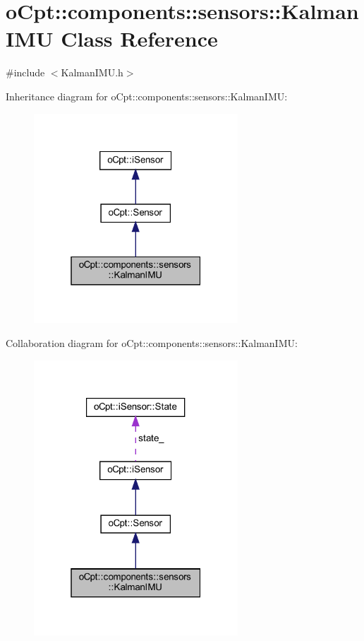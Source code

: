\hypertarget{classo_cpt_1_1components_1_1sensors_1_1_kalman_i_m_u}{}\section{o\+Cpt\+:\+:components\+:\+:sensors\+:\+:Kalman\+I\+MU Class Reference}
\label{classo_cpt_1_1components_1_1sensors_1_1_kalman_i_m_u}


{\ttfamily \#include $<$Kalman\+I\+M\+U.\+h$>$}



Inheritance diagram for o\+Cpt\+:\+:components\+:\+:sensors\+:\+:Kalman\+I\+MU\+:
\nopagebreak
\begin{figure}[H]
\begin{center}
\leavevmode
\includegraphics[width=217pt]{classo_cpt_1_1components_1_1sensors_1_1_kalman_i_m_u__inherit__graph}
\end{center}
\end{figure}


Collaboration diagram for o\+Cpt\+:\+:components\+:\+:sensors\+:\+:Kalman\+I\+MU\+:
\nopagebreak
\begin{figure}[H]
\begin{center}
\leavevmode
\includegraphics[width=217pt]{classo_cpt_1_1components_1_1sensors_1_1_kalman_i_m_u__coll__graph}
\end{center}
\end{figure}
